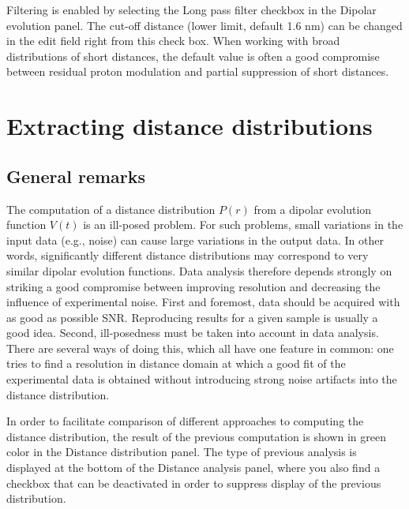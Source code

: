 \documentclass{article}
\begin{document}
Filtering is enabled by selecting the {\ttfamily Long pass filter} checkbox in the
{\ttfamily Dipolar evolution} panel. The cut-off distance (lower limit, default
1.6 nm) can be changed in the edit field right from this check box. When
working with broad distributions of short distances, the default value is often a
good compromise between residual proton modulation and partial suppression
of short distances.

\section{Extracting distance distributions}
\label{distribution}

\subsection{General remarks}
The computation of a distance distribution $P(r)$ from a dipolar evolution function
$V(t)$ is an ill-posed problem. For such problems, small variations in the
input data (e.g., noise) can cause large variations in the output data. In other
words, significantly different distance distributions may correspond to very similar
dipolar evolution functions. Data analysis therefore depends strongly
on striking a good compromise between improving resolution and decreasing the
influence of experimental noise. First
and foremost, data should be acquired with as good as possible SNR. Reproducing
results for a given sample is usually a good idea. Second,
ill-posedness must be taken into account in data analysis. There are several
ways of doing this, which all have one feature in common: one tries to find a
resolution in distance domain at which a good fit of the experimental data is
obtained without introducing strong noise artifacts into the distance distribution.

In order to facilitate comparison of different approaches to computing the distance distribution, the result of the previous computation is shown in green color in the {\ttfamily Distance distribution} panel. The type of previous analysis is displayed at the bottom of the {\ttfamily Distance analysis} panel, where you also find a checkbox that can be deactivated in order to suppress display of the previous distribution.
\end{document}
